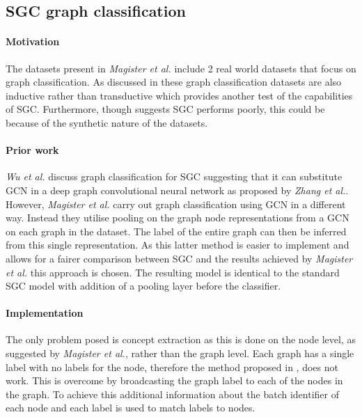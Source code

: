 \subsection{SGC graph classification}
\paragraph{Motivation}
The datasets present in \textit{Magister et al.}\cite{magister2021gcexplainer} include 2 real world datasets that focus on graph classification.
As discussed in  these graph classification datasets are also inductive rather than transductive which provides another test of the capabilities of SGC.
Furthermore, though  suggests SGC performs poorly, this could be because of the synthetic nature of the datasets.

\paragraph{Prior work}
\textit{Wu et al.}\cite{wu2019simplifying} discuss graph classification for SGC suggesting that it can substitute GCN in a deep graph convolutional neural network as proposed by \textit{Zhang et al.}\cite{zhang2018end}.
However, \textit{Magister et al.} carry out graph classification using GCN in a different way.
Instead they utilise pooling on the graph node representations from a GCN on each graph in the dataset.
The label of the entire graph can then be inferred from this single representation.
As this latter method is easier to implement and allows for a fairer comparison between SGC and the results achieved by \textit{Magister et al.} this approach is chosen.
The resulting model is identical to the standard SGC model with addition of a pooling layer before the classifier.

\paragraph{Implementation}
The only problem posed is concept extraction as this is done on the node level, as suggested by \textit{Magister et al.}, rather than the graph level.
Each graph has a single label with no labels for the node, therefore the method proposed in , does not work.
This is overcome by broadcasting the graph label to each of the nodes in the graph.
To achieve this additional information about the batch identifier of each node and each label is used to match labels to nodes.

